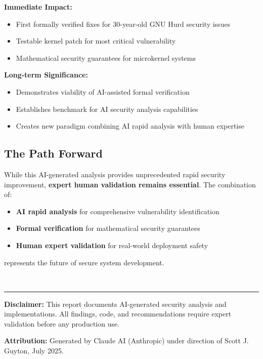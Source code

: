 \documentclass[11pt,a4paper]{article}
\begin{document}
\textbf{Immediate Impact:}
\begin{itemize}
    \item First formally verified fixes for 30-year-old GNU Hurd security issues
    \item Testable kernel patch for most critical vulnerability
    \item Mathematical security guarantees for microkernel systems
\end{itemize}

\textbf{Long-term Significance:}
\begin{itemize}
    \item Demonstrates viability of AI-assisted formal verification
    \item Establishes benchmark for AI security analysis capabilities
    \item Creates new paradigm combining AI rapid analysis with human expertise
\end{itemize}

\subsection{The Path Forward}

While this AI-generated analysis provides unprecedented rapid security improvement, \textbf{expert human validation remains essential}. The combination of:

\begin{itemize}
    \item \textbf{AI rapid analysis} for comprehensive vulnerability identification
    \item \textbf{Formal verification} for mathematical security guarantees
    \item \textbf{Human expert validation} for real-world deployment safety
\end{itemize}

represents the future of secure system development.

\begin{center}
\colorbox{successgreen}{\textcolor{white}{\textbf{The future of secure systems lies in AI-human collaboration}}}
\end{center}

\vspace{2cm}

\hrule

\vspace{0.5cm}

\textbf{Disclaimer:} This report documents AI-generated security analysis and implementations. All findings, code, and recommendations require expert validation before any production use.

\textbf{Attribution:} Generated by Claude AI (Anthropic) under direction of Scott J. Guyton, July 2025.
\end{document}

